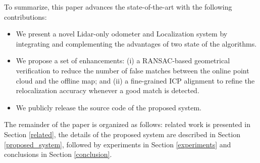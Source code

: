 \documentclass[letterpaper, 10 pt, conference]{ieeeconf}  %
\begin{document}

To summarize, this paper advances the state-of-the-art with the following contributions:
\begin{itemize}
    \item We present a novel Lidar-only odometer and Localization system by integrating and complementing the advantages of two state of the algorithms. 
    \item We propose a set of enhancements: (i) a RANSAC-based geometrical verification to reduce the number of false  
    matches between the online point cloud and the offline map; and (ii) a fine-grained ICP alignment to refine the relocalization accuracy whenever a good match is detected.
    \item We publicly release the source code of the proposed system.


\end{itemize}{}

The remainder of the paper is organized as follows: related work is presented in Section \ref{related}, the details of the proposed system are described in Section \ref{proposed_system}, followed by experiments in Section \ref{experiments} and conclusions in Section \ref{conclusion}.
\end{document}
